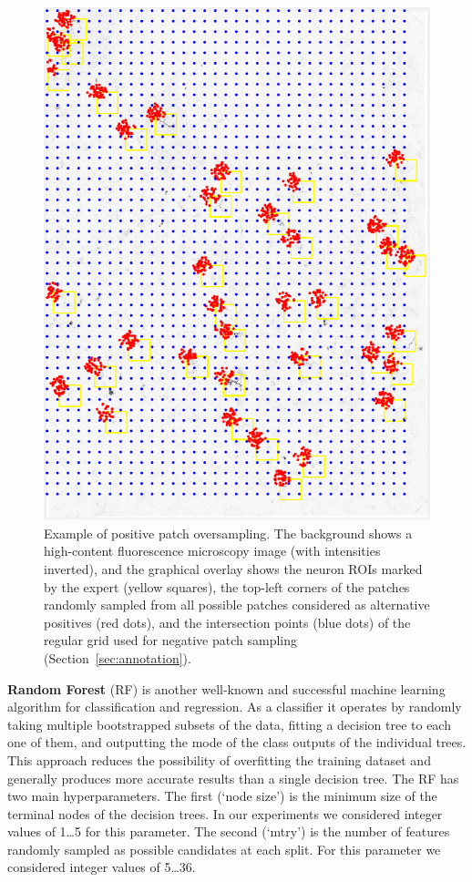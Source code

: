 \begin{figure}%
	\centering
	\includegraphics[width=\columnwidth]{fig03}
	\caption{Example of positive patch oversampling. The background shows a high-content fluorescence microscopy image (with intensities inverted), and the graphical overlay shows the neuron ROIs marked by the expert (yellow squares), the top-left corners of the patches randomly sampled from all possible patches considered as alternative positives (red dots), and the intersection points (blue dots) of the regular grid used for negative patch sampling (Section~\ref{sec:annotation}).}
	\label{fig:oversampling}
\end{figure}

{\bf Random Forest} (RF) is another well-known and successful machine learning algorithm \cite{Breiman2001} for classification and regression. As a classifier it operates by randomly taking multiple bootstrapped subsets of the data, fitting a decision tree to each one of them, and outputting the mode of the class outputs of the individual trees. This approach reduces the possibility of overfitting the training dataset and generally produces more accurate results than a single decision tree. The RF has two main hyperparameters. The first (`node size') is the minimum size of the terminal nodes of the decision trees. In our experiments we considered integer values of 1\dots5 for this parameter. The second (`mtry') is the number of features randomly sampled as possible candidates at each split. For this parameter we considered integer values of 5\dots36.

